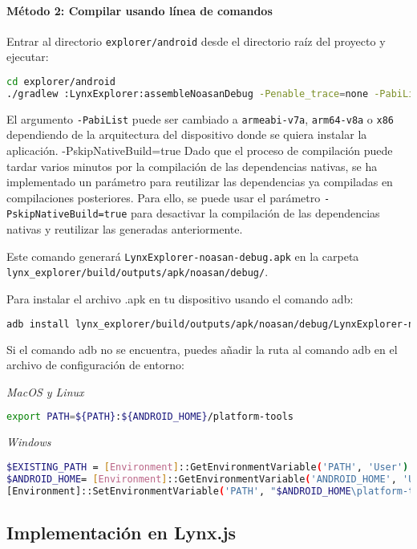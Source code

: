 \paragraph{Método 2: Compilar usando línea de comandos}
Entrar al directorio \texttt{explorer/android} desde el directorio raíz del proyecto y ejecutar:
\begin{lstlisting}[language=bash]
cd explorer/android
./gradlew :LynxExplorer:assembleNoasanDebug -Penable_trace=none -PabiList=x86_64
\end{lstlisting}
El argumento \texttt{-PabiList} puede ser cambiado a \texttt{armeabi-v7a}, \texttt{arm64-v8a} o \texttt{x86} dependiendo de la arquitectura del dispositivo donde se quiera instalar la aplicación.
-PskipNativeBuild=true
Dado que el proceso de compilación puede tardar varios minutos por la compilación de las dependencias nativas, se ha implementado un parámetro para reutilizar las dependencias ya compiladas en compilaciones posteriores. Para ello, se puede usar el parámetro \texttt{-PskipNativeBuild=true} para desactivar la compilación de las dependencias nativas y reutilizar las generadas anteriormente.

Este comando generará \texttt{LynxExplorer-noasan-debug.apk} en la carpeta \\
\texttt{lynx\_explorer/build/outputs/apk/noasan/debug/}.

Para instalar el archivo .apk en tu dispositivo usando el comando adb:
\begin{lstlisting}[language=bash]
adb install lynx_explorer/build/outputs/apk/noasan/debug/LynxExplorer-noasan-debug.apk
\end{lstlisting}

Si el comando adb no se encuentra, puedes añadir la ruta al comando adb en el archivo de configuración de entorno:

\textit{MacOS y Linux}
\begin{lstlisting}[language=bash]
export PATH=${PATH}:${ANDROID_HOME}/platform-tools
\end{lstlisting}

\textit{Windows}
\begin{lstlisting}[language=bash]
$EXISTING_PATH = [Environment]::GetEnvironmentVariable('PATH', 'User')
$ANDROID_HOME= [Environment]::GetEnvironmentVariable('ANDROID_HOME', 'User')
[Environment]::SetEnvironmentVariable('PATH', "$ANDROID_HOME\platform-tools;$EXISTING_PATH ", 'User')
\end{lstlisting}

\subsection{Implementación en Lynx.js}
